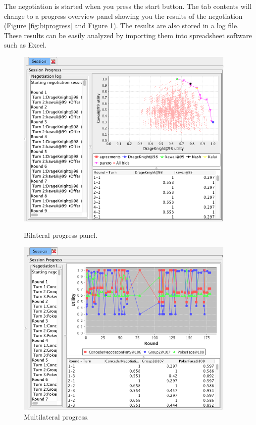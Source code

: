 \documentclass[]{article}
\begin{document}
The negotiation is started when you press the start button. The tab contents will change to  a progress overview panel
showing you the results of the negotiation (Figure \ref{fig:biprogress} and Figure \ref{fig:multiprogress}). The results are also stored in a log file.
 These results can be easily analyzed by importing them into spreadsheet software such as Excel.

	\begin{figure}[ht]
		\center
		\begin{minipage}[b]{0.4\linewidth}
			\includegraphics[width=0.95\textwidth]{media/bilateralprogress.png}
		\caption{Bilateral progress panel.}
		\label{fig:biprogress}
		\end{minipage}
		\begin{minipage}[b]{0.4\linewidth}
			\includegraphics[width=0.95\textwidth]{media/multilateralprogress.png}
		\caption{Multilateral progress.}\label{fig:multiprogress}
		\end{minipage}
		\end{figure}
		
\end{document}
